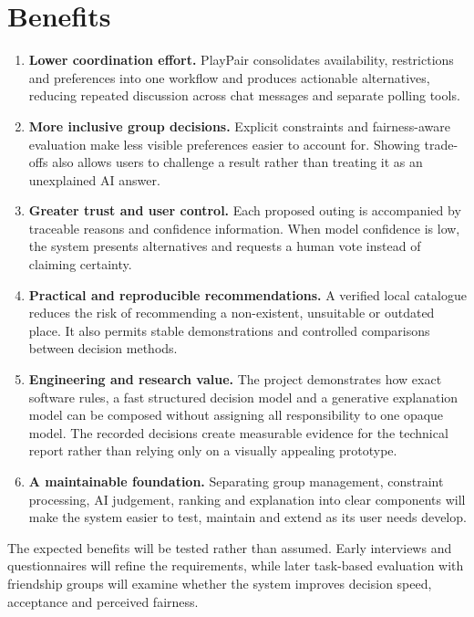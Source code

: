 \documentclass[12pt,a4paper]{article}
\begin{document}
\section*{Benefits}

\begin{enumerate}
  \item \textbf{Lower coordination effort.} PlayPair consolidates availability, restrictions and preferences into one workflow and produces actionable alternatives, reducing repeated discussion across chat messages and separate polling tools.

  \item \textbf{More inclusive group decisions.} Explicit constraints and fairness-aware evaluation make less visible preferences easier to account for. Showing trade-offs also allows users to challenge a result rather than treating it as an unexplained AI answer.

  \item \textbf{Greater trust and user control.} Each proposed outing is accompanied by traceable reasons and confidence information. When model confidence is low, the system presents alternatives and requests a human vote instead of claiming certainty.

  \item \textbf{Practical and reproducible recommendations.} A verified local catalogue reduces the risk of recommending a non-existent, unsuitable or outdated place. It also permits stable demonstrations and controlled comparisons between decision methods.

  \item \textbf{Engineering and research value.} The project demonstrates how exact software rules, a fast structured decision model and a generative explanation model can be composed without assigning all responsibility to one opaque model. The recorded decisions create measurable evidence for the technical report rather than relying only on a visually appealing prototype.

  \item \textbf{A maintainable foundation.} Separating group management, constraint processing, AI judgement, ranking and explanation into clear components will make the system easier to test, maintain and extend as its user needs develop.
\end{enumerate}

The expected benefits will be tested rather than assumed. Early interviews and questionnaires will refine the requirements, while later task-based evaluation with friendship groups will examine whether the system improves decision speed, acceptance and perceived fairness.
\end{document}
